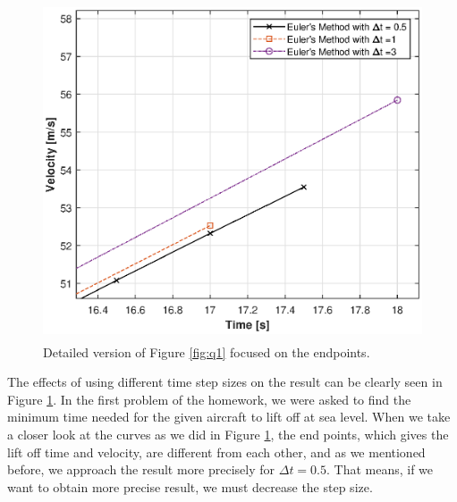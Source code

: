 \documentclass[letterpaper,12pt]{article}
\begin{document}
\newpage
\begin{figure}[ht]
        \centering \includegraphics[max height=10cm]{graphs/question1_finaltime.eps}
        \caption{Detailed version of Figure \ref{fig:q1} focused on the endpoints.}
        \label{fig:q1_closer}
\end{figure}

 The effects of using different time step sizes on the result can be clearly seen in Figure \ref{fig:q1_closer}.
 In the first problem of the homework, we were asked to find the minimum time needed for the given aircraft to
 lift off at sea level. When we take a closer look at the curves as we did in Figure \ref{fig:q1_closer}, the
 end points, which gives the lift off time and velocity, are different from each other, and as we mentioned 
 before, we approach the result more precisely for $ \Delta t = 0.5 $. That means, if we want to obtain more precise result, 
 we must decrease the step size.
\newpage
\end{document}
